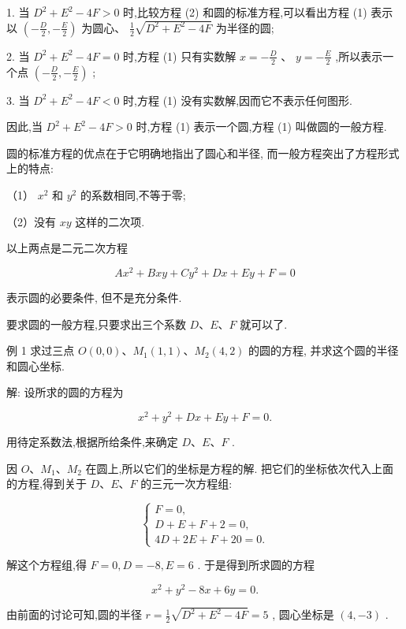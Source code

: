 \documentclass[lang=cn,newtx,10pt,scheme=chinese]{elegantbook}
\begin{document}
1. 当 \({D}^{2} + {E}^{2} - {4F} > 0\) 时,比较方程 (2) 和圆的标准方程,可以看出方程 (1) 表示以 \(\left( {-\frac{D}{2}, - \frac{E}{2}}\right)\) 为圆心、 \(\frac{1}{2}\sqrt{{D}^{2} + {E}^{2} - {4F}}\) 为半径的圆;

2. 当 \({D}^{2} + {E}^{2} - {4F} = 0\) 时,方程 (1) 只有实数解 \(x = - \frac{D}{2}\) 、 \(y = - \frac{E}{2}\) ,所以表示一个点 \(\left( {-\frac{D}{2}, - \frac{E}{2}}\right)\) ;

3. 当 \({D}^{2} + {E}^{2} - {4F} < 0\) 时,方程 (1) 没有实数解,因而它不表示任何图形.

因此,当 \({D}^{2} + {E}^{2} - {4F} > 0\) 时,方程 (1) 表示一个圆,方程 (1) 叫做圆的一般方程.

圆的标准方程的优点在于它明确地指出了圆心和半径, 而一般方程突出了方程形式上的特点:

（1） \({x}^{2}\) 和 \({y}^{2}\) 的系数相同,不等于零;

（2）没有 \({xy}\) 这样的二次项.

以上两点是二元二次方程

\[
  A{x}^{2} + {Bxy} + C{y}^{2} + {Dx} + {Ey} + F = 0
\]

表示圆的必要条件, 但不是充分条件.

要求圆的一般方程,只要求出三个系数 \(D\text{、}E\text{、}F\) 就可以了.

例 1 求过三点 \(O\left( {0,0}\right) \text{、}{M}_{1}\left( {1,1}\right) \text{、}{M}_{2}\left( {4,2}\right)\) 的圆的方程, 并求这个圆的半径和圆心坐标.

解: 设所求的圆的方程为

\[
    {x}^{2} + {y}^{2} + {Dx} + {Ey} + F = 0.
\]

用待定系数法,根据所给条件,来确定 \(D\text{、}E\text{、}F\) .

因 \(O\text{、}{M}_{1}\text{、}{M}_{2}\) 在圆上,所以它们的坐标是方程的解. 把它们的坐标依次代入上面的方程,得到关于 \(D\text{、}E\text{、}F\) 的三元一次方程组:

\[
  \left\{ \begin{array}{l} F = 0, \\ D + E + F + 2 = 0, \\ {4D} + {2E} + F + {20} = 0. \end{array}\right.
\]

解这个方程组,得 \(F = 0,D = - 8,E = 6\) . 于是得到所求圆的方程

\[
    {x}^{2} + {y}^{2} - {8x} + {6y} = 0.
\]

由前面的讨论可知,圆的半径 \(r = \frac{1}{2}\sqrt{{D}^{2} + {E}^{2} - {4F}} = 5\) , 圆心坐标是 \(\left( {4, - 3}\right)\) .
\end{document}
